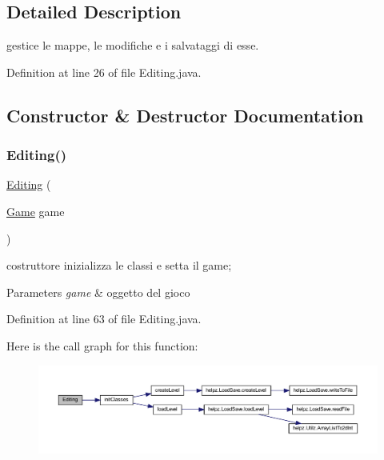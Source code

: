 \subsection{Detailed Description}
gestice le mappe, le modifiche e i salvataggi di esse. 

Definition at line 26 of file Editing.\+java.



\subsection{Constructor \& Destructor Documentation}
\mbox{\label{classscenes_1_1_editing_a2ca3ef24637fa4a614988adee4b8689d}} 
\subsubsection{\texorpdfstring{Editing()}{Editing()}}
{\footnotesize\ttfamily \hyperlink{classscenes_1_1_editing}{Editing} (\begin{DoxyParamCaption}\item[{\hyperlink{classprogetto_1_1_game}{Game}}]{game }\end{DoxyParamCaption})}



costruttore inizializza le classi e setta il game; 


\begin{DoxyParams}{Parameters}
{\em game} & oggetto del gioco \\
\hline
\end{DoxyParams}


Definition at line 63 of file Editing.\+java.

Here is the call graph for this function\+:\nopagebreak
\begin{figure}[H]
\begin{center}
\leavevmode
\includegraphics[width=350pt]{classscenes_1_1_editing_a2ca3ef24637fa4a614988adee4b8689d_cgraph}
\end{center}
\end{figure}


